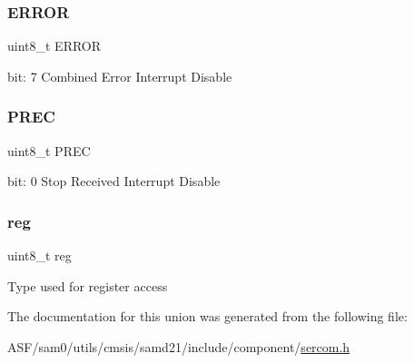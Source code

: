 \subsubsection{\texorpdfstring{ERROR}{ERROR}}
{\footnotesize\ttfamily uint8\+\_\+t E\+R\+R\+OR}

bit\+: 7 Combined Error Interrupt Disable \mbox{\label{union_s_e_r_c_o_m___i2_c_s___i_n_t_e_n_c_l_r___type_a0a58b5fb217cc2964590994ae435b2f4}} 
\subsubsection{\texorpdfstring{PREC}{PREC}}
{\footnotesize\ttfamily uint8\+\_\+t P\+R\+EC}

bit\+: 0 Stop Received Interrupt Disable \mbox{\label{union_s_e_r_c_o_m___i2_c_s___i_n_t_e_n_c_l_r___type_a9428adc9af4653a2050e2536b55dec8d}} 
\subsubsection{\texorpdfstring{reg}{reg}}
{\footnotesize\ttfamily uint8\+\_\+t reg}

Type used for register access 

The documentation for this union was generated from the following file\+:\begin{DoxyCompactItemize}
\item 
A\+S\+F/sam0/utils/cmsis/samd21/include/component/\mbox{\hyperlink{utils_2cmsis_2samd21_2include_2component_2sercom_8h}{sercom.\+h}}\end{DoxyCompactItemize}
